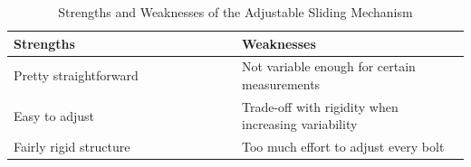\documentclass[a4paper,10pt]{article}
\begin{document}
\begin{table}[h]
  \centering
  \begin{tabular}{p{0.5\linewidth} | p{0.5\linewidth}}
    Strengths                                              & Weaknesses \\ \hline
    \textbullet{} Pretty straightforward                   & \textbullet{} Not variable enough for certain measurements \\
    \textbullet{} Easy to adjust                            & \textbullet{} Trade-off with rigidity when increasing variability \\
    \textbullet{} Fairly rigid structure                    & \textbullet{} Too much effort to adjust every bolt \\
  \end{tabular}
  \caption{Strengths and Weaknesses of the Adjustable Sliding Mechanism}
  \label{table:adjustable-block-pros-cons}
\end{table}


\pagebreak
\printglossaries
\end{document}
